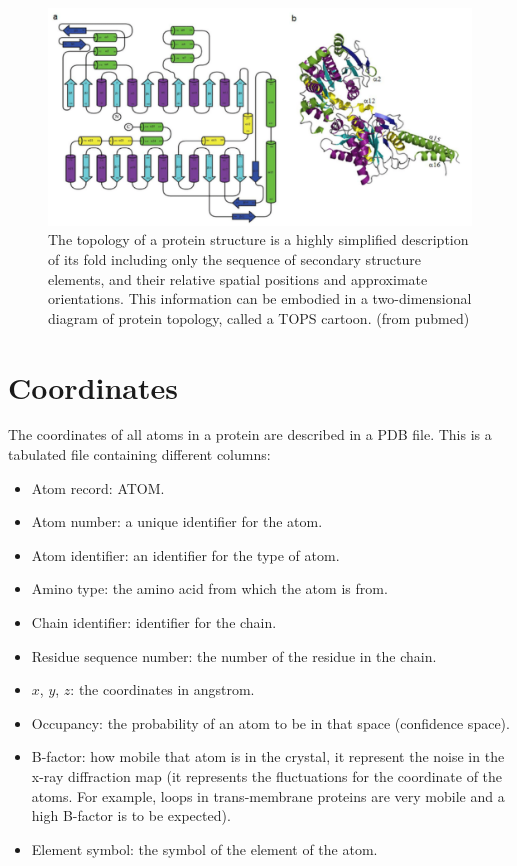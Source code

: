 \begin{figure}[H]
			\centering
			\includegraphics[width=\textwidth]{topology.png}
			\caption{The topology of a protein structure is a highly simplified description of its fold including only the sequence of secondary structure elements, and their relative spatial positions and approximate orientations. This information can be embodied in a two-dimensional diagram of protein topology, called a TOPS cartoon. (from pubmed)}
			\label{fig:topology}
			\end{figure}


\section{Coordinates}
The coordinates of all atoms in a protein are described in a PDB file.
This is a tabulated file containing different columns:

\begin{multicols}{2}
	\begin{itemize}
		\item Atom record: ATOM.
		\item Atom number: a unique identifier for the atom.
		\item Atom identifier: an identifier for the type of atom.
		\item Amino type: the amino acid from which the atom is from.
		\item Chain identifier: identifier for the chain.
		\item Residue sequence number: the number of the residue in the chain.
		\item $x$, $y$, $z$: the coordinates in angstrom.
		\item Occupancy: the probability of an atom to be in that space (confidence space).
		\item B-factor: how mobile that atom is in the crystal, it represent the noise in the x-ray diffraction map (it represents the fluctuations for the coordinate of the atoms. For example, loops in trans-membrane proteins are very mobile and a high B-factor is to be expected).
		\item Element symbol: the symbol of the element of the atom.
	\end{itemize}
\end{multicols}

